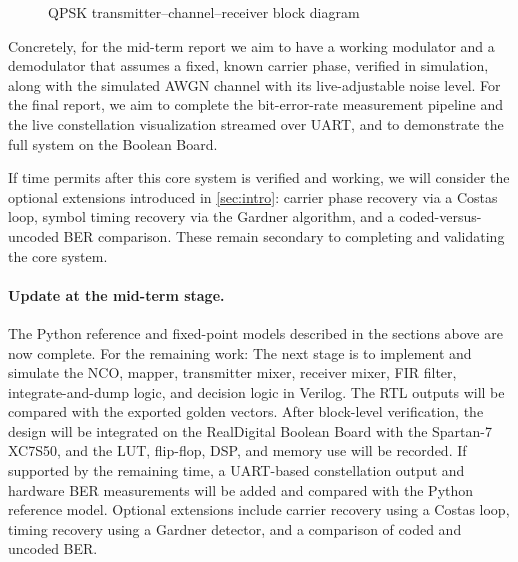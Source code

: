 \documentclass[10pt,twocolumn,letterpaper]{article}
\newcommand{\newstart}{\begingroup\color{blue}}
\newcommand{\newend}{\endgroup}
\begin{document}
\begin{figure}[t]
\caption{QPSK transmitter--channel--receiver block diagram}
\label{fig:onecol}
\end{figure}

Concretely, for the mid-term report we aim to have a working
modulator and a demodulator that assumes a fixed, known carrier phase,
verified in simulation, along with the simulated AWGN channel with its
live-adjustable noise level. For the final report, we aim to complete
the bit-error-rate measurement pipeline and the live constellation
visualization streamed over UART, and to demonstrate the full system
on the Boolean Board.

If time permits after this core system is verified and working, we
will consider the optional extensions introduced in
\cref{sec:intro}: carrier phase recovery via a Costas loop, symbol
timing recovery via the Gardner algorithm, and a coded-versus-uncoded
BER comparison. These remain secondary to completing and validating
the core system.

\newstart
\paragraph{Update at the mid-term stage.} The Python reference and fixed-point models described in the sections above are now complete. For the remaining work:
The next stage is to implement and simulate the NCO, mapper, transmitter mixer, receiver mixer, FIR filter, integrate-and-dump logic, and decision logic in Verilog. The RTL outputs will be compared with the exported golden vectors. After block-level verification, the design will be integrated on the RealDigital Boolean Board with the Spartan-7 XC7S50, and the LUT, flip-flop, DSP, and memory use will be recorded. If supported by the remaining time, a UART-based constellation output and hardware BER measurements will be added and compared with the Python reference model. Optional extensions include carrier recovery using a Costas loop, timing recovery using a Gardner detector, and a comparison of coded and uncoded BER.
\newend
\end{document}
